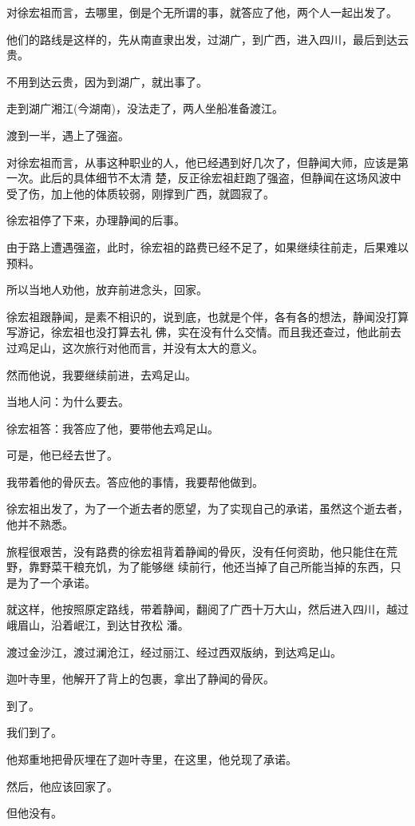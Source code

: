 \documentclass[11pt,a4paper,onecolumn]{article}
\begin{document}
对徐宏祖而言，去哪里，倒是个无所谓的事，就答应了他，两个人一起出发了。

他们的路线是这样的，先从南直隶出发，过湖广，到广西，进入四川，最后到达云贵。

不用到达云贵，因为到湖广，就出事了。

走到湖广湘江(今湖南)，没法走了，两人坐船准备渡江。

渡到一半，遇上了强盗。

对徐宏祖而言，从事这种职业的人，他已经遇到好几次了，但静闻大师，应该是第一次。此后的具体细节不太清
楚，反正徐宏祖赶跑了强盗，但静闻在这场风波中受了伤，加上他的体质较弱，刚撑到广西，就圆寂了。

徐宏祖停了下来，办理静闻的后事。

由于路上遭遇强盗，此时，徐宏祖的路费已经不足了，如果继续往前走，后果难以预料。

所以当地人劝他，放弃前进念头，回家。

徐宏祖跟静闻，是素不相识的，说到底，也就是个伴，各有各的想法，静闻没打算写游记，徐宏祖也没打算去礼
佛，实在没有什么交情。而且我还查过，他此前去过鸡足山，这次旅行对他而言，并没有太大的意义。

然而他说，我要继续前进，去鸡足山。

当地人问：为什么要去。

徐宏祖答：我答应了他，要带他去鸡足山。

可是，他已经去世了。

我带着他的骨灰去。答应他的事情，我要帮他做到。

徐宏祖出发了，为了一个逝去者的愿望，为了实现自己的承诺，虽然这个逝去者，他并不熟悉。

旅程很艰苦，没有路费的徐宏祖背着静闻的骨灰，没有任何资助，他只能住在荒野，靠野菜干粮充饥，为了能够继
续前行，他还当掉了自己所能当掉的东西，只是为了一个承诺。

就这样，他按照原定路线，带着静闻，翻阅了广西十万大山，然后进入四川，越过峨眉山，沿着岷江，到达甘孜松
潘。

渡过金沙江，渡过澜沧江，经过丽江、经过西双版纳，到达鸡足山。

迦叶寺里，他解开了背上的包裹，拿出了静闻的骨灰。

到了。

我们到了。

他郑重地把骨灰埋在了迦叶寺里，在这里，他兑现了承诺。

然后，他应该回家了。

但他没有。

\section[\thesection]{}
\end{document}

